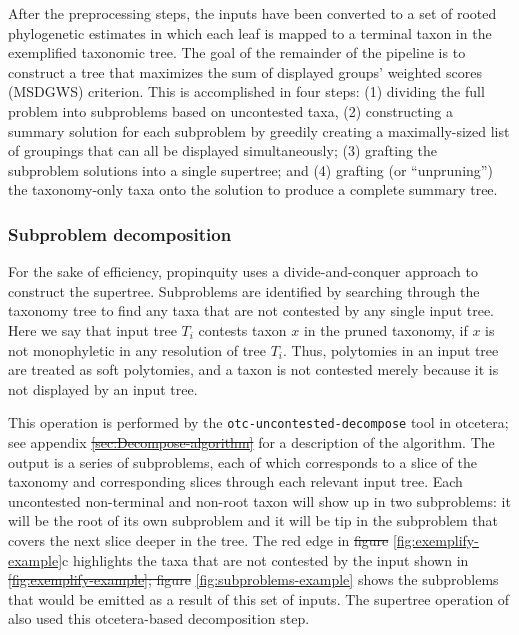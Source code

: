 \documentclass[fleqn,12pt,lineno,english]{wlpeerj}
\providecommand{\DIFaddtex}[1]{{\protect\color{blue}\uwave{#1}}} %
\providecommand{\DIFdeltex}[1]{{\protect\color{red}\sout{#1}}}                      %
\providecommand{\DIFaddbegin}{} %
\providecommand{\DIFaddend}{} %
\providecommand{\DIFdelbegin}{} %
\providecommand{\DIFdelend}{} %
\providecommand{\DIFadd}[1]{\texorpdfstring{\DIFaddtex{#1}}{#1}} %
\providecommand{\DIFdel}[1]{\texorpdfstring{\DIFdeltex{#1}}{}} %
\begin{document}
After the preprocessing steps, the inputs have been converted to a
set of rooted phylogenetic estimates in which each leaf is mapped
to a terminal taxon in the exemplified taxonomic tree. The goal of
the remainder of the pipeline is to construct a tree that maximizes
the sum of displayed groups' weighted scores (MSDGWS) criterion. This is accomplished
in four steps: (1) dividing the full problem into subproblems based
on uncontested taxa, (2) constructing a summary solution for each
subproblem by greedily creating a maximally-sized list of groupings
that can all be displayed simultaneously; (3) grafting the subproblem
solutions into a single supertree; and (4) grafting (or ``unpruning'')
the taxonomy-only taxa onto the solution to produce a complete summary
tree.

\subsubsection{Subproblem decomposition\label{subsec:Subproblem-decomposition}}

For the sake of efficiency, propinquity uses a divide-and-conquer
approach to construct the supertree. Subproblems are identified by
searching through the taxonomy tree to find any taxa that are not contested
by any single input tree. Here we say that input tree $T_{i}$ contests
taxon $x$ in the pruned taxonomy, if $x$ is not monophyletic in
any resolution of tree $T_{i}$. Thus, polytomies in an input tree
are treated as soft polytomies, and a taxon is not contested merely
because it is not displayed by an input tree. 

This operation is performed by the \texttt{otc-uncontested-decompose}
tool in otcetera; see appendix \DIFdelbegin \DIFdel{\ref{sec:Decompose-algorithm} }\DIFdelend \DIFaddbegin \DIFadd{B }\DIFaddend for
a description of the algorithm. The output is a series of subproblems,
each of which corresponds to a slice of the taxonomy and corresponding
slices through each relevant input tree. Each uncontested non-terminal
and non-root taxon will show up in two subproblems: it will be the
root of its own subproblem and it will be tip in the subproblem that
covers the next slice deeper in the tree. The red edge in \DIFdelbegin \DIFdel{figure }\DIFdelend \DIFaddbegin \DIFadd{Fig. }\DIFaddend \ref{fig:exemplify-example}c
highlights the taxa that are not contested by the input shown in \DIFdelbegin \DIFdel{\ref{fig:exemplify-example};
figure }\DIFdelend \DIFaddbegin \DIFadd{Fig. \ref{fig:exemplify-example};
Fig. }\DIFaddend \ref{fig:subproblems-example} shows the subproblems that would
be emitted as a result of this set of inputs. The supertree operation
of \citet{HinchliffEtAl2015} also used this otcetera-based decomposition
step.
\end{document}
